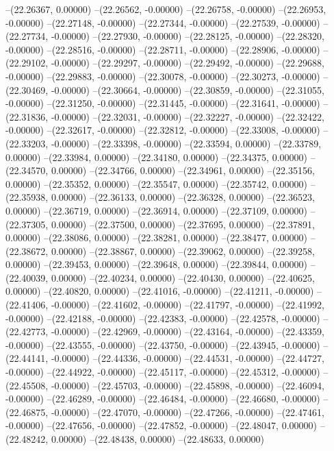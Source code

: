 --(22.26367, 0.00000)
--(22.26562, -0.00000)
--(22.26758, -0.00000)
--(22.26953, -0.00000)
--(22.27148, -0.00000)
--(22.27344, -0.00000)
--(22.27539, -0.00000)
--(22.27734, -0.00000)
--(22.27930, -0.00000)
--(22.28125, -0.00000)
--(22.28320, -0.00000)
--(22.28516, -0.00000)
--(22.28711, -0.00000)
--(22.28906, -0.00000)
--(22.29102, -0.00000)
--(22.29297, -0.00000)
--(22.29492, -0.00000)
--(22.29688, -0.00000)
--(22.29883, -0.00000)
--(22.30078, -0.00000)
--(22.30273, -0.00000)
--(22.30469, -0.00000)
--(22.30664, -0.00000)
--(22.30859, -0.00000)
--(22.31055, -0.00000)
--(22.31250, -0.00000)
--(22.31445, -0.00000)
--(22.31641, -0.00000)
--(22.31836, -0.00000)
--(22.32031, -0.00000)
--(22.32227, -0.00000)
--(22.32422, -0.00000)
--(22.32617, -0.00000)
--(22.32812, -0.00000)
--(22.33008, -0.00000)
--(22.33203, -0.00000)
--(22.33398, -0.00000)
--(22.33594, 0.00000)
--(22.33789, 0.00000)
--(22.33984, 0.00000)
--(22.34180, 0.00000)
--(22.34375, 0.00000)
--(22.34570, 0.00000)
--(22.34766, 0.00000)
--(22.34961, 0.00000)
--(22.35156, 0.00000)
--(22.35352, 0.00000)
--(22.35547, 0.00000)
--(22.35742, 0.00000)
--(22.35938, 0.00000)
--(22.36133, 0.00000)
--(22.36328, 0.00000)
--(22.36523, 0.00000)
--(22.36719, 0.00000)
--(22.36914, 0.00000)
--(22.37109, 0.00000)
--(22.37305, 0.00000)
--(22.37500, 0.00000)
--(22.37695, 0.00000)
--(22.37891, 0.00000)
--(22.38086, 0.00000)
--(22.38281, 0.00000)
--(22.38477, 0.00000)
--(22.38672, 0.00000)
--(22.38867, 0.00000)
--(22.39062, 0.00000)
--(22.39258, 0.00000)
--(22.39453, 0.00000)
--(22.39648, 0.00000)
--(22.39844, 0.00000)
--(22.40039, 0.00000)
--(22.40234, 0.00000)
--(22.40430, 0.00000)
--(22.40625, 0.00000)
--(22.40820, 0.00000)
--(22.41016, -0.00000)
--(22.41211, -0.00000)
--(22.41406, -0.00000)
--(22.41602, -0.00000)
--(22.41797, -0.00000)
--(22.41992, -0.00000)
--(22.42188, -0.00000)
--(22.42383, -0.00000)
--(22.42578, -0.00000)
--(22.42773, -0.00000)
--(22.42969, -0.00000)
--(22.43164, -0.00000)
--(22.43359, -0.00000)
--(22.43555, -0.00000)
--(22.43750, -0.00000)
--(22.43945, -0.00000)
--(22.44141, -0.00000)
--(22.44336, -0.00000)
--(22.44531, -0.00000)
--(22.44727, -0.00000)
--(22.44922, -0.00000)
--(22.45117, -0.00000)
--(22.45312, -0.00000)
--(22.45508, -0.00000)
--(22.45703, -0.00000)
--(22.45898, -0.00000)
--(22.46094, -0.00000)
--(22.46289, -0.00000)
--(22.46484, -0.00000)
--(22.46680, -0.00000)
--(22.46875, -0.00000)
--(22.47070, -0.00000)
--(22.47266, -0.00000)
--(22.47461, -0.00000)
--(22.47656, -0.00000)
--(22.47852, -0.00000)
--(22.48047, 0.00000)
--(22.48242, 0.00000)
--(22.48438, 0.00000)
--(22.48633, 0.00000)
